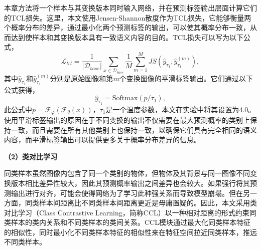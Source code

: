 本章方法将一个样本与其变换版本同时输入网络，并在预测标签输出层面计算它们的TCL损失。这里，本文使用Jensen-Shannon散度\cite{JS1, JS2}作为TCL损失，它能够衡量两个概率分布的差异，通过最小化两个预测标签的输出，可以使其概率分布一致，从而达到使样本和其变换版本具有一致语义内容的目的。TCL损失可以写为以下公式，
\begin{equation}
\label{equation3:3.6}
  \mathcal{L}_{tcl} = \frac{1}{|\mathcal{D}_{base}|}\sum_{x \in \mathcal{D}_{base}}\frac{1}{M}\sum_{m=1}^{M}JS(\widehat{y}_{\tau_1}, \widehat{y}_{\tau_1}^{(m)}),
\end{equation}
其中$\widehat{y}_{\tau_1}$和$\widehat{y}_{\tau_1}^{(m)}$分别是原始图像和第$m$个变换图像的平滑标签输出。它们通过以下公式获得，
\begin{equation}
\label{equation3:3.7}
  \widehat{y}_{\tau_1} = \text{Softmax}(p/\tau_1),
\end{equation}
此公式中$p = \mathcal{F}_{\varphi}(\mathcal{F}_{\theta}(x))$，$\tau_1$是一个温度参数，本文在实验中将其设置为$4.0$。使用平滑标签输出的原因在于不同变换的输出不仅需要在最大预测概率的类别上保持一致，而且需要在所有其他类别上也保持一致，以确保它们具有完全相同的语义内容，而平滑标签输出可以提供更多关于概率分布差异的信息。

\textbf{（2）类对比学习}

同类样本虽然图像内包含了同一个类别的物体，但物体及其背景与同一图像不同变换版本相比差异性较大，因此其预测概率输出之间差异也会较大。如果强行将其预测输出进行对齐，可能会使得网络为了学习此种强关系而导致模型崩塌。但在另一方面，同类样本间距离比不同类样本间距离更近是毋庸置疑的。因此，本文采用类对比学习（Class Contrastive Learning，简称CCL）以一种相对距离的形式约束同类样本的类内关系和不同类样本的类间关系。CCL模块通过最大化同类样本特征的相似性，同时最小化不同类样本特征的相似性来在特征空间拉近同类样本，推远不同类样本。

